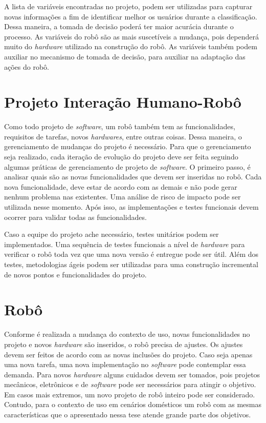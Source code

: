 A lista de variáveis encontradas no projeto, podem ser utilizadas para capturar novas informações a fim  de identificar melhor os usuários durante a classificação. Dessa maneira, a tomada de decisão poderá ter maior acurácia durante o processo. As variáveis do robô são as mais suscetíveis a mudança, pois dependerá muito do \emph{hardware} utilizado na construção do robô. As variáveis também podem auxiliar no mecanismo de tomada de decisão, para auxiliar na adaptação das ações do robô.

\section{Projeto Interação Humano-Robô}
\label{sec:projetoihr2}
Como todo projeto de \emph{software}, um robô também tem as funcionalidades, requisitos de tarefas, novos \emph{hardwares}, entre outras coisas. Dessa maneira, o gerenciamento de mudanças do projeto é necessário. Para que o gerenciamento seja realizado, cada iteração de evolução do projeto deve ser feita seguindo algumas práticas de gerenciamento de projeto de \emph{software}. O primeiro passo, é analisar quais são as novas funcionalidades que devem ser inseridas no robô. Cada nova funcionalidade, deve estar de acordo com as demais e não pode gerar nenhum problema nas existentes. Uma análise de risco de impacto pode ser utilizada nesse momento. Após isso, as implementações e testes funcionais devem ocorrer para validar todas as funcionalidades.

Caso a equipe do projeto ache necessário, testes unitários podem ser implementados. Uma sequência de testes funcionais a nível de \emph{hardware} para verificar o robô toda vez que uma nova versão é entregue pode ser útil. Além dos testes, metodologias ágeis podem ser utilizadas para uma construção incremental de novos pontos e funcionalidades do projeto.

\section{Robô}
\label{sec:robo2}
Conforme é realizada a mudança do contexto de uso, novas funcionalidades no projeto e novos \emph{hardware} são inseridos, o robô precisa de ajustes. Os ajustes devem ser feitos de acordo com as novas inclusões do projeto. Caso seja apenas uma nova tarefa, uma nova implementação no \emph{software} pode contemplar essa demanda. Para novos \emph{hardware} alguns cuidados devem ser tomados, pois projetos mecânicos, eletrônicos e de \emph{software} pode ser necessários para atingir o objetivo. Em casos mais extremos, um novo projeto de robô inteiro pode ser considerado. Contudo, para o contexto de uso em cenários domésticos um robô com as mesmas características que o apresentado nessa tese atende grande parte dos objetivos.

